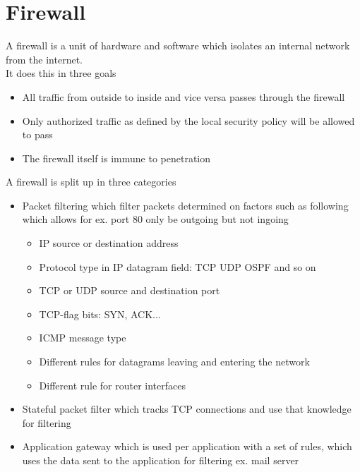 \documentclass[12pt, a4paper]{article}
\begin{document}
	\section{Firewall}
		A firewall is a unit of hardware and software which isolates an internal network from the internet.\\
		It does this in three goals
		\begin{itemize}
			\item All traffic from outside to inside and vice versa passes through the firewall
			\item Only authorized traffic as defined by the local security policy will be allowed to pass
			\item The firewall itself is immune to penetration
		\end{itemize}
		A firewall is split up in three categories
		\begin{itemize}
			\item Packet filtering which filter packets determined on factors such as following which allows for ex. port 80 only be outgoing but not ingoing
			\begin{itemize}
				\item IP source or destination address
				\item Protocol type in IP datagram field: TCP UDP OSPF and so on
				\item TCP or UDP source and destination port
				\item TCP-flag bits: SYN, ACK...
				\item ICMP message type
				\item Different rules for datagrams leaving and entering the network
				\item Different rule for router interfaces
			\end{itemize}
			\item Stateful packet filter which tracks TCP connections and use that knowledge for filtering
			\item Application gateway which is used per application with a set of rules, which uses the data sent to the application for filtering ex. mail server
		\end{itemize}
\end{document}
